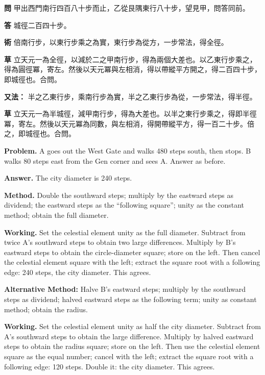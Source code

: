 \documentclass[11pt,a4paper]{article}
\newlength{\chwidth}
\newlength{\enwidth}
\newcommand{\zh}[1]{{\CJKfamily{sf}#1}}
\newenvironment{bilingual}{%
  \noindent
  \begin{minipage}[t]{\chwidth}%
  \small
}{%
  \end{minipage}%
}
\newcommand{\switchcolumn}{%
  \end{minipage}%
  \hfill%
  \begin{minipage}[t]{\enwidth}%
  \small
}
\begin{document}
\begin{bilingual}
\noindent\textbf{\zh{問}} \zh{甲出西門南行四百八十步而止，乙從艮隅東行八十步，望見甲，問答同前。}

\vspace{0.2cm}
\noindent\textbf{\zh{答}} \zh{城徑二百四十步。}

\vspace{0.2cm}
\noindent\textbf{\zh{術}} \zh{倍南行步，以東行步乘之為實，東行步為從方，一步常法，得全徑。}

\vspace{0.2cm}
\noindent\textbf{\zh{草}} \zh{立天元一為全徑，以減於二之甲南行步，得為兩個大差也。以乙東行步乘之，得為圓徑冪，寄左。然後以天元冪與左相消，得以帶縱平方開之，得二百四十步，即城徑也。合問。}

\vspace{0.2cm}
\noindent\textbf{\zh{又法：}} \zh{半之乙東行步，乘南行步為實，半之乙東行步為從，一步常法，得半徑。}

\vspace{0.2cm}
\noindent\textbf{\zh{草}} \zh{立天元一為半城徑，減甲南行步，得為大差也。以半之東行步乘之，得即半徑冪，寄左。然後以天元冪為同數，與左相消，得開帶縱平方，得一百二十步。倍之，即城徑也。合問。}

\switchcolumn

\noindent\textbf{Problem.} A goes out the West Gate and walks 480 steps south, then stops. B walks 80 steps east from the Gen corner and sees A. Answer as before.

\vspace{0.2cm}
\noindent\textbf{Answer.} The city diameter is 240 steps.

\vspace{0.2cm}
\noindent\textbf{Method.} Double the southward steps; multiply by the eastward steps as dividend; the eastward steps as the ``following square''; unity as the constant method; obtain the full diameter.

\vspace{0.2cm}
\noindent\textbf{Working.} Set the celestial element unity as the full diameter. Subtract from twice A's southward steps to obtain two large differences. Multiply by B's eastward steps to obtain the circle-diameter square; store on the left. Then cancel the celestial element square with the left; extract the square root with a following edge: 240 steps, the city diameter. This agrees.

\vspace{0.2cm}
\noindent\textbf{Alternative Method:} Halve B's eastward steps; multiply by the southward steps as dividend; halved eastward steps as the following term; unity as constant method; obtain the radius.

\vspace{0.2cm}
\noindent\textbf{Working.} Set the celestial element unity as half the city diameter. Subtract from A's southward steps to obtain the large difference. Multiply by halved eastward steps to obtain the radius square; store on the left. Then use the celestial element square as the equal number; cancel with the left; extract the square root with a following edge: 120 steps. Double it: the city diameter. This agrees.
\end{bilingual}
\end{document}
